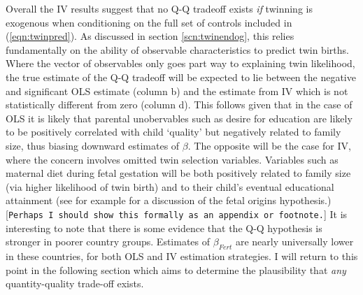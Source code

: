 \documentclass{article}[11pt,subeqn]
\begin{document}
\begin{spacing}{1.5}
Overall the IV results suggest that no Q-Q tradeoff exists \emph{if} twinning is exogenous when conditioning on the full set of controls included in (\ref{eqn:twinpred}).  As 
discussed in section \ref{scn:twinendog}, this relies fundamentally on the ability of observable characteristics to predict twin births.  Where the vector of observables only goes
part way to explaining twin likelihood, the true estimate of the Q-Q tradeoff will be expected to lie between the negative and significant OLS estimate (column b) and the estimate 
from IV which is not statistically different from zero (column d).  This follows given that in the case of OLS it is likely that parental unobervables such as desire for education are likely to be positively correlated with child `quality' but negatively related to family size, thus biasing downward estimates of $\beta$.  The opposite will be the case for IV, where the concern involves omitted twin selection variables.  Variables such as maternal diet during fetal gestation will be both positively related to family size (via higher likelihood of twin birth) and to their child's eventual educational attainment (see for example \citet{Barker1995} for a discussion of the fetal origins hypothesis.)  [\texttt{Perhaps I should show this formally as an appendix or footnote.}]  It is interesting to note that there is some evidence that the Q-Q hypothesis is stronger in poorer country groups.  Estimates of $\beta_{Fert}$ are nearly universally lower in these countries, for both OLS and IV estimation strategies.  I will return to this point in the following section which aims to determine the plausibility that \emph{any} quantity-quality trade-off exists.




\end{spacing}
\end{document}
